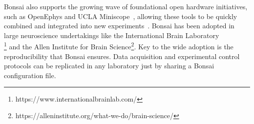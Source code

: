 Bonsai also supports the growing wave of foundational
open hardware initiatives, such as OpenEphys \citep{siegleEtAl17} and UCLA
Miniscope~\citep{caiEtAl16}, allowing these tools to be quickly combined and integrated into new experiments~\citep{buccinoEtAl18}.
%
Bonsai has been adopted in large neuroscience undertakings like the
International Brain
Laboratory\\ \footnote{https://www.internationalbrainlab.com/}
and the Allen Institute for Brain
Science\footnote{https://alleninstitute.org/what-we-do/brain-science/}.
%
Key to the wide adoption is the reproducibility that Bonsai ensures.  Data acquisition and experimental control protocols can be 
replicated in any laboratory just by sharing a Bonsai configuration file. 
%


